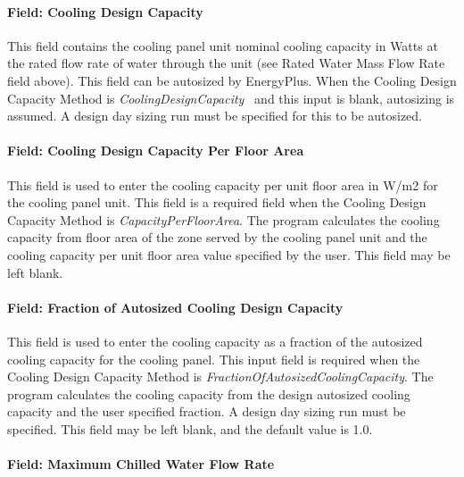 \paragraph{Field: Cooling Design Capacity}\label{field-cooling-design-capacity-2}

This field contains the cooling panel unit nominal cooling capacity in Watts at the rated flow rate of water through the unit (see Rated Water Mass Flow Rate field above). This field can be autosized by EnergyPlus. When the Cooling Design Capacity Method is \emph{CoolingDesignCapacity}~ and this input is blank, autosizing is assumed. A design day sizing run must be specified for this to be autosized.

\paragraph{Field: Cooling Design Capacity Per Floor Area}\label{field-cooling-design-capacity-per-floor-area-2}

This field is used to enter the cooling capacity per unit floor area in W/m2 for the cooling panel unit. This field is a required field when the Cooling Design Capacity Method is \emph{CapacityPerFloorArea}. The program calculates the cooling capacity from floor area of the zone served by the cooling panel unit and the cooling capacity per unit floor area value specified by the user. This field may be left blank.

\paragraph{Field: Fraction of Autosized Cooling Design Capacity}\label{field-fraction-of-autosized-cooling-design-capacity-2}

This field is used to enter the cooling capacity as a fraction of the autosized cooling capacity for the cooling panel. This input field is required when the Cooling Design Capacity Method is \emph{FractionOfAutosizedCoolingCapacity}. The program calculates the cooling capacity from the design autosized cooling capacity and the user specified fraction. A design day sizing run must be specified. This field may be left blank, and the default value is 1.0.

\paragraph{Field: Maximum Chilled Water Flow Rate}\label{field-maximum-chilled-water-flow-rate}

